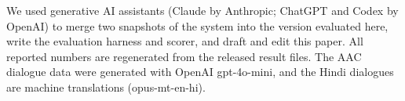 We used generative AI assistants (Claude by Anthropic; ChatGPT and Codex by OpenAI) to merge two snapshots of the system into the version evaluated here, write the evaluation harness and scorer, and draft and edit this paper.
All reported numbers are regenerated from the released result files.
The AAC dialogue data were generated with OpenAI gpt-4o-mini, and the Hindi dialogues are machine translations (opus-mt-en-hi).
